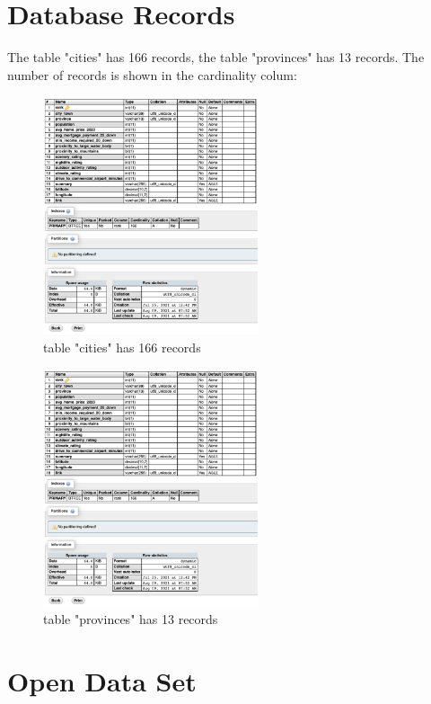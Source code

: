 \documentclass[12pt, letterpaper]{article}
\begin{document}
\section{Database Records}
The table "cities" has 166 records, the table "provinces" has 13 records. 
The number of records is shown in the cardinality colum:

\begin{figure}[htbp]
	\centering
	\includegraphics[width=2.5in]{images/q20-1.png}
	\caption{table "cities" has 166 records}
 \end{figure}


\begin{figure}[htbp]
	\centering
	\includegraphics[width=2.5in]{images/q20-2.png}
	\caption{table "provinces" has 13 records}
 \end{figure}
 \newpage

\section{Open Data Set}
\end{document}

